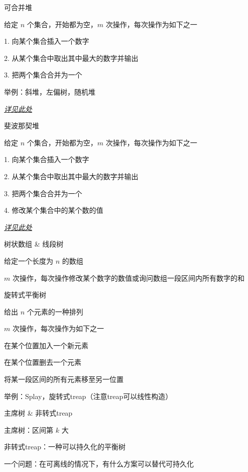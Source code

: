 \documentclass[UTF8]{beamer}
\begin{document}
			\begin{frame}{可合并堆}

			给定 $n$ 个集合，开始都为空，$m$ 次操作，每次操作为如下之一

			1. 向某个集合插入一个数字

			2. 从某个集合中取出其中最大的数字并输出

			3. 把两个集合合并为一个

			举例：斜堆，左偏树，随机堆

			\href{https://blog.csdn.net/jacajava/article/details/44680951}{\emph{\underline{详见此处}}}

			\end{frame}

			\begin{frame}{斐波那契堆}

			给定 $n$ 个集合，开始都为空，$m$ 次操作，每次操作为如下之一

			1. 向某个集合插入一个数字

			2. 从某个集合中取出其中最大的数字并输出

			3. 把两个集合合并为一个

			4. 修改某个集合中的某个数的值

			\href{https://www.cnblogs.com/skywang12345/p/3659060.html}{\emph{\underline{详见此处}}}

			\end{frame}

			\begin{frame}{树状数组 \& 线段树}

			给定一个长度为 $n$ 的数组

			$m$ 次操作，每次操作修改某个数字的数值或询问数组一段区间内所有数字的和

			\end{frame}

			\begin{frame}{旋转式平衡树}

			给出 $n$ 个元素的一种排列

			$m$ 次操作，每次操作为如下之一

			在某个位置加入一个新元素

			在某个位置删去一个元素

			将某一段区间的所有元素移至另一位置

			举例：Splay，旋转式treap（注意treap可以线性构造）

			\end{frame}

			\begin{frame}{主席树 \& 非转式treap} 

			主席树：区间第 $k$ 大

			非转式treap：一种可以持久化的平衡树

			一个问题：在可离线的情况下，有什么方案可以替代可持久化

			\end{frame}
\end{document}
